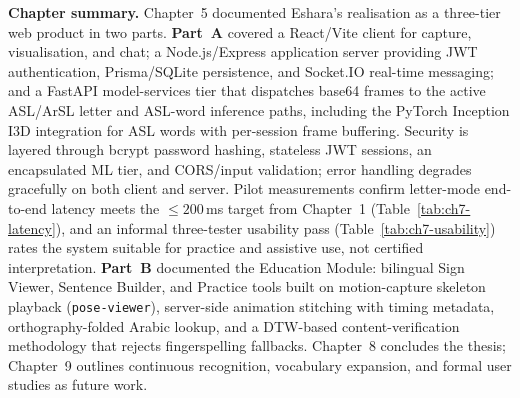 \clearpage
\noindent\textbf{Chapter summary.} Chapter~5 documented Eshara's realisation as a three-tier web product in two parts. \textbf{Part~A} covered a React/Vite client for capture, visualisation, and chat; a Node.js/Express application server providing JWT authentication, Prisma/SQLite persistence, and Socket.IO real-time messaging; and a FastAPI model-services tier that dispatches base64 frames to the active ASL/ArSL letter and ASL-word inference paths, including the PyTorch Inception I3D integration for ASL words with per-session frame buffering. Security is layered through bcrypt password hashing, stateless JWT sessions, an encapsulated ML tier, and CORS/input validation; error handling degrades gracefully on both client and server. Pilot measurements confirm letter-mode end-to-end latency meets the $\leq 200$\,ms target from Chapter~1 (Table~\ref{tab:ch7-latency}), and an informal three-tester usability pass (Table~\ref{tab:ch7-usability}) rates the system suitable for practice and assistive use, not certified interpretation. \textbf{Part~B} documented the Education Module: bilingual Sign Viewer, Sentence Builder, and Practice tools built on motion-capture skeleton playback (\texttt{pose-viewer}), server-side animation stitching with timing metadata, orthography-folded Arabic lookup, and a DTW-based content-verification methodology that rejects fingerspelling fallbacks. Chapter~8 concludes the thesis; Chapter~9 outlines continuous recognition, vocabulary expansion, and formal user studies as future work.\par

